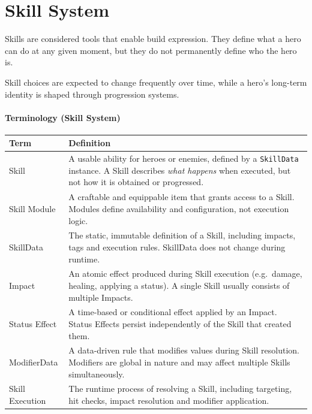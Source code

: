 \section{Skill System}
\label{sec:skill-system}

Skills are considered tools that enable build expression.
They define what a hero can do at any given moment, but they do not permanently define who the hero is.

Skill choices are expected to change frequently over time, while a hero’s long-term identity is shaped through progression systems.

\paragraph{Terminology (Skill System)}
\begin{tabular}{l p{11.5cm}}
	\hline
	\textbf{Term} & \textbf{Definition} \\
	\hline
	Skill &	A usable ability for heroes or enemies, defined by a \texttt{SkillData} instance.  
	A Skill describes \emph{what happens} when executed, but not how it is obtained or progressed. \\	

	Skill Module &	A craftable and equippable item that grants access to a Skill.  
	Modules define availability and configuration, not execution logic. \\
	
	SkillData &	The static, immutable definition of a Skill, including impacts, tags and execution rules.  
	SkillData does not change during runtime. \\
	
	Impact &	An atomic effect produced during Skill execution (e.g.\ damage, healing, applying a status).  
	A single Skill usually consists of multiple Impacts. \\
	
	Status Effect &	A time-based or conditional effect applied by an Impact.  
	Status Effects persist independently of the Skill that created them. \\
	
	ModifierData &	A data-driven rule that modifies values during Skill resolution.  
	Modifiers are global in nature and may affect multiple Skills simultaneously. \\
	
	Skill Execution &	The runtime process of resolving a Skill, including targeting, hit checks, impact resolution and modifier application. \\
	\hline
\end{tabular}

